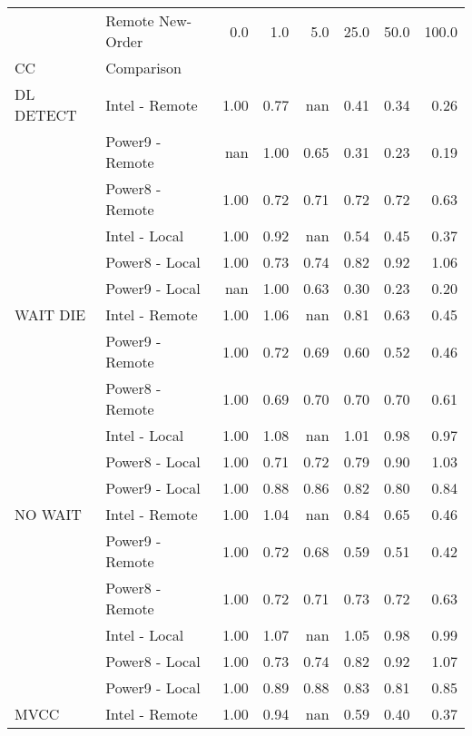 \begin{tabular}{llrrrrrr}
\toprule
       & Remote New-Order &  0.0   &  1.0   &  5.0   &  25.0  &  50.0  &  100.0 \\
CC & Comparison &        &        &        &        &        &        \\
\midrule
DL DETECT & Intel - Remote &   1.00 &   0.77 &    nan &   0.41 &   0.34 &   0.26 \\
       & Power9 - Remote &    nan &   1.00 &   0.65 &   0.31 &   0.23 &   0.19 \\
       & Power8 - Remote &   1.00 &   0.72 &   0.71 &   0.72 &   0.72 &   0.63 \\
       & Intel - Local &   1.00 &   0.92 &    nan &   0.54 &   0.45 &   0.37 \\
       & Power8 - Local &   1.00 &   0.73 &   0.74 &   0.82 &   0.92 &   1.06 \\
       & Power9 - Local &    nan &   1.00 &   0.63 &   0.30 &   0.23 &   0.20 \\
WAIT DIE & Intel - Remote &   1.00 &   1.06 &    nan &   0.81 &   0.63 &   0.45 \\
       & Power9 - Remote &   1.00 &   0.72 &   0.69 &   0.60 &   0.52 &   0.46 \\
       & Power8 - Remote &   1.00 &   0.69 &   0.70 &   0.70 &   0.70 &   0.61 \\
       & Intel - Local &   1.00 &   1.08 &    nan &   1.01 &   0.98 &   0.97 \\
       & Power8 - Local &   1.00 &   0.71 &   0.72 &   0.79 &   0.90 &   1.03 \\
       & Power9 - Local &   1.00 &   0.88 &   0.86 &   0.82 &   0.80 &   0.84 \\
NO WAIT & Intel - Remote &   1.00 &   1.04 &    nan &   0.84 &   0.65 &   0.46 \\
       & Power9 - Remote &   1.00 &   0.72 &   0.68 &   0.59 &   0.51 &   0.42 \\
       & Power8 - Remote &   1.00 &   0.72 &   0.71 &   0.73 &   0.72 &   0.63 \\
       & Intel - Local &   1.00 &   1.07 &    nan &   1.05 &   0.98 &   0.99 \\
       & Power8 - Local &   1.00 &   0.73 &   0.74 &   0.82 &   0.92 &   1.07 \\
       & Power9 - Local &   1.00 &   0.89 &   0.88 &   0.83 &   0.81 &   0.85 \\
MVCC & Intel - Remote &   1.00 &   0.94 &    nan &   0.59 &   0.40 &   0.37 \\

\end{tabular}
